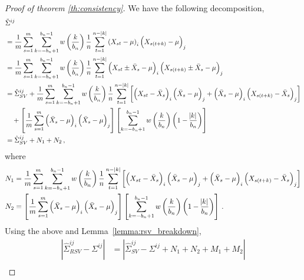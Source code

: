 \documentclass[11pt]{article}
\newtheorem{lemma}{Lemma}
\theoremstyle{remark}
\begin{document}
%
\begin{proof}[Proof of theorem \ref{th:consistency}]
We have the following decomposition,
\begin{align*}
    &\tilde{\Sigma}^{ij} \\
    & = \dfrac{1}{m}\sum_{s=1}^{m}\sum_{k=-b_n+1}^{b_n-1}w\left(\dfrac{k}{b_n}\right)\dfrac{1}{n}\sum_{t=1}^{n-|k|}  \left(X_{st} - \mu \right)_i  \left(X_{s(t + k)} - \mu \right)_j\\
    & = \dfrac{1}{m}\sum_{s=1}^{m}\sum_{k=-b_n+1}^{b_n-1}w\left(\dfrac{k}{b_n}\right)\dfrac{1}{n}\sum_{t=1}^{n-|k|}  \left(X_{st} \pm \bar{X}_s - \mu \right)_i  \left(X_{s(t + k)} \pm \bar{X}_s - \mu \right)_j\\
    & = \hat{\Sigma}_{SV}^{ij} + \dfrac{1}{m}\sum_{s=1}^{m}\sum_{k=-b_n+1}^{b_n-1}w\left(\dfrac{k}{b_n}\right)\dfrac{1}{n}\sum_{t=1}^{n-|k|}\left[ \left(X_{st} - \bar{X}_s \right)_i   \left(\bar{X}_s - \mu \right)_j + \left(\bar{X}_s - \mu \right)_i  \left(X_{s(t+k)} - \bar{X}_s \right)_j\right]\\
    & \quad + \left[\dfrac{1}{m}  \sum_{s=1}^{m}  \left(\bar{X}_s - \mu \right)_i  \left(\bar{X}_s - \mu \right)_j \right]  \left[\sum_{k=-b_n+1}^{b_n-1}w\left(\dfrac{k}{b_n}\right)\left(1 - \dfrac{\abs{k}}{b_n}\right) \right]\\
    & = \hat{\Sigma}_{SV}^{ij} + N_1 + N_2 \,,
\end{align*}
where
\begin{align*}
N_1 & = \dfrac{1}{m}\sum_{s=1}^{m}  \sum_{k=-b_n+1}^{b_n-1}  w\left(\dfrac{k}{b_n}\right)\dfrac{1}{n}  \sum_{t=1}^{n-|k|}  \left[ \left(X_{st} - \bar{X}_s \right)_i  \left(\bar{X}_s - \mu \right)_j + \left(\bar{X}_s - \mu \right)_i  \left(X_{s(t+k)} - \bar{X}_s \right)_j\right]\\
N_2 & = \left[\dfrac{1}{m}  \sum_{s=1}^{m}  \left(\bar{X}_s - \mu \right)_i  \left(\bar{X}_s - \mu \right)_j \right]  \left[\sum_{k=-b_n+1}^{b_n-1}w\left(\dfrac{k}{b_n}\right)\left(1 - \dfrac{\abs{k}}{b_n}\right) \right]\,.
\end{align*}
%
Using the above and  Lemma~\ref{lemma:rsv_breakdown}, 
\begin{align*}
\left|\hat{\Sigma}_{RSV}^{ij} - \Sigma^{ij} \right| & = \left| \hat{\Sigma}_{SV}^{ij} - \Sigma^{ij} + N_1 + N_2 + M_1 + M_2 \right| \\

\end{align*}
\end{proof}
\end{document}
